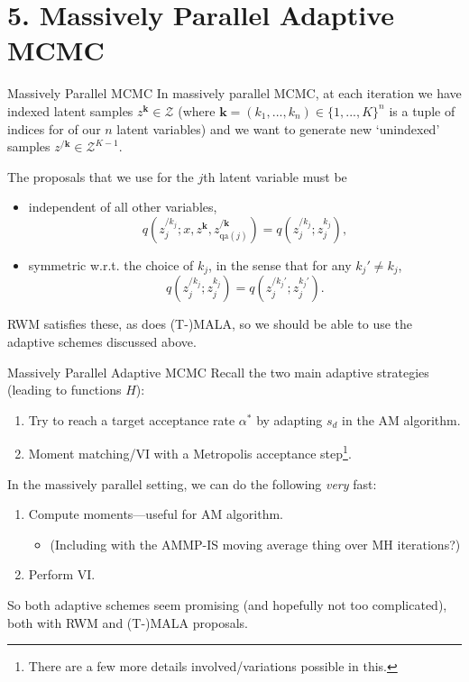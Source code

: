 \documentclass[aspectratio=169]{beamer}
\let\oldfootnote\footnote
\renewcommand{\footnote}{\only<+->\oldfootnote}
\begin{document}
\section{5. Massively Parallel Adaptive MCMC}
\begin{frame}{Massively Parallel MCMC}
    In massively parallel MCMC, at each iteration we have indexed latent samples $z^\mathbf{k} \in \mathcal{Z}$ (where $\mathbf{k} = (k_1, ..., k_n) \in \{1,...,K\}^n$ is a tuple of indices for of our $n$ latent variables) and we want to generate new `unindexed' samples $z^{/\mathbf{k}} \in \mathcal{Z}^{K-1}$.

    \pause

    The proposals that we use for the $j$th latent variable must be
    \begin{itemize}[<+->]
        \item independent of all other variables, 
            $$q(z_j^{/k_j}; x, z^\mathbf{k}, z^{/\mathbf{k}}_{\text{qa}(j)}) = q(z_j^{/k_j}; z_j^{k_j}),$$
        \item symmetric w.r.t. the choice of $k_j$, in the sense that for any $k_j' \neq k_j$, 
            $$q(z_j^{/k_j}; z_j^{k_j}) = q(z_j^{/k_j'}; z_j^{k_j'}).$$
    \end{itemize}

    \pause
    RWM satisfies these, as does (T-)MALA, so we should be able to use the adaptive schemes discussed above.

\end{frame}

\begin{frame}{Massively Parallel Adaptive MCMC}
    Recall the two main adaptive strategies (leading to functions $H$):
    \begin{enumerate}
        \item Try to reach a target acceptance rate $\alpha^*$ by adapting $s_d$ in the AM algorithm.
        \item Moment matching/VI with a Metropolis acceptance step\footnote{There are a few more details involved/variations possible in this.}.
    \end{enumerate}

    \pause

    In the massively parallel setting, we can do the following \textit{very} fast:
    \begin{enumerate}
        \item Compute moments---useful for AM algorithm.
        \begin{itemize}
            \item (Including with the AMMP-IS moving average thing over MH iterations?)
        \end{itemize}
        \item Perform VI.
    \end{enumerate}

    \pause

    So both adaptive schemes seem promising (and hopefully not too complicated), both with RWM and (T-)MALA proposals.
\end{frame}
\end{document}
